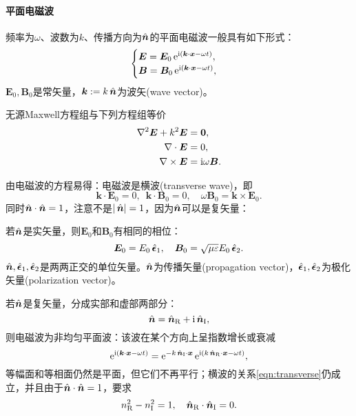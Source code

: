 \paragraph{平面电磁波}
频率为$\omega$、波数为$k$、传播方向为$\mathop{}\!\hat{\bm{n}}$的平面电磁波一般具有如下形式：
\begin{equation}
    \begin{cases}
        \bm E=\bm E_0\mathop{}\!\mathrm{e}^{\mathrm{i}(\bm k\cdot\bm x-\omega t)},\\
        \bm B=\bm B_0\mathop{}\!\mathrm{e}^{\mathrm{i}(\bm k\cdot\bm x-\omega t)},
    \end{cases}
\end{equation}
$\bm E_0,\bm B_0$是常矢量，$\bm k:=k\mathop{}\!\hat{\bm{n}}$为波矢(wave vector)。
\begin{example}{}{}
    无源Maxwell方程组与下列方程组等价
    \begin{align*}
        \nabla^2\bm E+k^2\bm E&=\bm 0,\\
        \nabla\cdot\bm E&=0,\\
        \nabla\times\bm E&=\mathrm{i}\omega\bm B.
    \end{align*}
\end{example}
由电磁波的方程易得：电磁波是横波(transverse wave)，即
\begin{equation}
    \label{eqn:transverse}
    \bm k\cdot\bm E_0=0,\enspace\bm k\cdot\bm B_0=0,\quad\omega\bm B_0=\bm k\times\bm E_0.
\end{equation}
同时$\mathop{}\!\hat{\bm{n}}\cdot\mathop{}\!\hat{\bm{n}}=1$，注意不是$|\mathop{}\!\hat{\bm{n}}|=1$，因为$\mathop{}\!\hat{\bm{n}}$可以是复矢量：
\begin{compactitem}
	\item 若$\mathop{}\!\hat{\bm{n}}$是实矢量，则$\bm E_0$和$\bm B_0$有相同的相位：
    \[
        \bm E_0=E_0\mathop{}\!\hat{\bm{\epsilon}}_1,\quad \bm B_0=\sqrt{\mu\varepsilon}E_0\mathop{}\!\hat{\bm{\epsilon}}_2.
    \]
    $\mathop{}\!\hat{\bm{n}},\mathop{}\!\hat{\bm{\epsilon}}_1,\mathop{}\!\hat{\bm{\epsilon}}_2$是两两正交的单位矢量。$\mathop{}\!\hat{\bm{n}}$为传播矢量(propagation vector)，$\mathop{}\!\hat{\bm{\epsilon}}_1,\mathop{}\!\hat{\bm{\epsilon}}_2$为极化矢量(polarization vector)。
	\item 若$\mathop{}\!\hat{\bm{n}}$是复矢量，分成实部和虚部两部分：
    \[
        \mathop{}\!\hat{\bm{n}}=\mathop{}\!\hat{\bm{n}}_\text R+\mathrm{i}\mathop{}\!\hat{\bm{n}}_\text I,
    \]
    则电磁波为非均匀平面波：该波在某个方向上呈指数增长或衰减
    \[
        \mathop{}\!\mathrm{e}^{\mathrm{i}(\bm k\cdot\bm x-\omega t)}=\mathop{}\!\mathrm{e}^{-k\mathop{}\!\hat{\bm{n}}_\text I\cdot\bm x}\mathop{}\!\mathrm{e}^{\mathrm{i}(k\mathop{}\!\hat{\bm{n}}_\text R\cdot\bm x-\omega t)},
    \]
    等幅面和等相面仍然是平面，但它们不再平行；横波的关系\eqref{eqn:transverse}仍成立，并且由于$\mathop{}\!\hat{\bm{n}}\cdot\mathop{}\!\hat{\bm{n}}=1$，要求
    \[
        n_\text R^2-n_\text I^2=1,\quad \mathop{}\!\hat{\bm{n}}_\text R\cdot\mathop{}\!\hat{\bm{n}}_\text I=0.
    \]
\end{compactitem}

